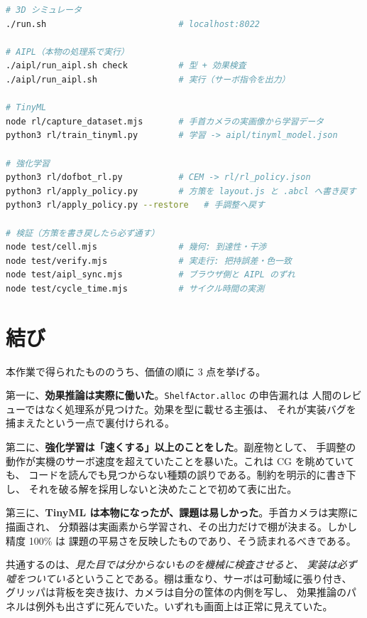 \documentclass[11pt,a4paper]{article}
\begin{document}
\begin{lstlisting}[language=bash,basicstyle=\ttfamily\scriptsize]
# 3D シミュレータ
./run.sh                          # localhost:8022

# AIPL（本物の処理系で実行）
./aipl/run_aipl.sh check          # 型 + 効果検査
./aipl/run_aipl.sh                # 実行（サーボ指令を出力）

# TinyML
node rl/capture_dataset.mjs       # 手首カメラの実画像から学習データ
python3 rl/train_tinyml.py        # 学習 -> aipl/tinyml_model.json

# 強化学習
python3 rl/dofbot_rl.py           # CEM -> rl/rl_policy.json
python3 rl/apply_policy.py        # 方策を layout.js と .abcl へ書き戻す
python3 rl/apply_policy.py --restore   # 手調整へ戻す

# 検証（方策を書き戻したら必ず通す）
node test/cell.mjs                # 幾何: 到達性・干渉
node test/verify.mjs              # 実走行: 把持誤差・色一致
node test/aipl_sync.mjs           # ブラウザ側と AIPL のずれ
node test/cycle_time.mjs          # サイクル時間の実測
\end{lstlisting}

\section{結び}

本作業で得られたもののうち、価値の順に 3 点を挙げる。

第一に、\textbf{効果推論は実際に働いた}。\texttt{ShelfActor.alloc} の申告漏れは
人間のレビューではなく処理系が見つけた。効果を型に載せる主張は、
それが実装バグを捕まえたという一点で裏付けられる。

第二に、\textbf{強化学習は「速くする」以上のことをした}。副産物として、
手調整の動作が実機のサーボ速度を超えていたことを暴いた。これは CG を眺めていても、
コードを読んでも見つからない種類の誤りである。制約を明示的に書き下し、
それを破る解を採用しないと決めたことで初めて表に出た。

第三に、\textbf{TinyML は本物になったが、課題は易しかった}。手首カメラは実際に描画され、
分類器は実画素から学習され、その出力だけで棚が決まる。しかし精度 100\% は
課題の平易さを反映したものであり、そう読まれるべきである。

共通するのは、\emph{見た目では分からないものを機械に検査させると、
実装は必ず嘘をついている}ということである。棚は重なり、サーボは可動域に張り付き、
グリッパは背板を突き抜け、カメラは自分の筐体の内側を写し、
効果推論のパネルは例外も出さずに死んでいた。いずれも画面上は正常に見えていた。
\end{document}
